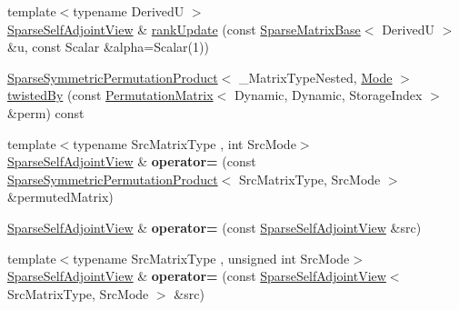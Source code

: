 \begin{DoxyCompactItemize}
\item 
{\footnotesize template$<$typename DerivedU $>$ }\\\mbox{\hyperlink{class_eigen_1_1_sparse_self_adjoint_view}{Sparse\+Self\+Adjoint\+View}} \& \mbox{\hyperlink{class_eigen_1_1_sparse_self_adjoint_view_abe66734215f8d8220be0985d67901021}{rank\+Update}} (const \mbox{\hyperlink{class_eigen_1_1_sparse_matrix_base}{Sparse\+Matrix\+Base}}$<$ DerivedU $>$ \&u, const Scalar \&alpha=Scalar(1))
\item 
\mbox{\hyperlink{class_eigen_1_1_sparse_symmetric_permutation_product}{Sparse\+Symmetric\+Permutation\+Product}}$<$ \+\_\+\+Matrix\+Type\+Nested, \mbox{\hyperlink{struct_mode}{Mode}} $>$ \mbox{\hyperlink{class_eigen_1_1_sparse_self_adjoint_view_acde15b45cf7b43520e1005ec65d55f3c}{twisted\+By}} (const \mbox{\hyperlink{class_eigen_1_1_permutation_matrix}{Permutation\+Matrix}}$<$ Dynamic, Dynamic, Storage\+Index $>$ \&perm) const
\item 
\mbox{\label{class_eigen_1_1_sparse_self_adjoint_view_af2a90db8d1332dc854c798044de2d0ad}} 
{\footnotesize template$<$typename Src\+Matrix\+Type , int Src\+Mode$>$ }\\\mbox{\hyperlink{class_eigen_1_1_sparse_self_adjoint_view}{Sparse\+Self\+Adjoint\+View}} \& {\bfseries operator=} (const \mbox{\hyperlink{class_eigen_1_1_sparse_symmetric_permutation_product}{Sparse\+Symmetric\+Permutation\+Product}}$<$ Src\+Matrix\+Type, Src\+Mode $>$ \&permuted\+Matrix)
\item 
\mbox{\label{class_eigen_1_1_sparse_self_adjoint_view_ac738fb02b74bebcce8631633a6f0c31a}} 
\mbox{\hyperlink{class_eigen_1_1_sparse_self_adjoint_view}{Sparse\+Self\+Adjoint\+View}} \& {\bfseries operator=} (const \mbox{\hyperlink{class_eigen_1_1_sparse_self_adjoint_view}{Sparse\+Self\+Adjoint\+View}} \&src)
\item 
\mbox{\label{class_eigen_1_1_sparse_self_adjoint_view_a52fbdf30546b4bb19e2333f1ab59e651}} 
{\footnotesize template$<$typename Src\+Matrix\+Type , unsigned int Src\+Mode$>$ }\\\mbox{\hyperlink{class_eigen_1_1_sparse_self_adjoint_view}{Sparse\+Self\+Adjoint\+View}} \& {\bfseries operator=} (const \mbox{\hyperlink{class_eigen_1_1_sparse_self_adjoint_view}{Sparse\+Self\+Adjoint\+View}}$<$ Src\+Matrix\+Type, Src\+Mode $>$ \&src)

\end{DoxyCompactItemize}
